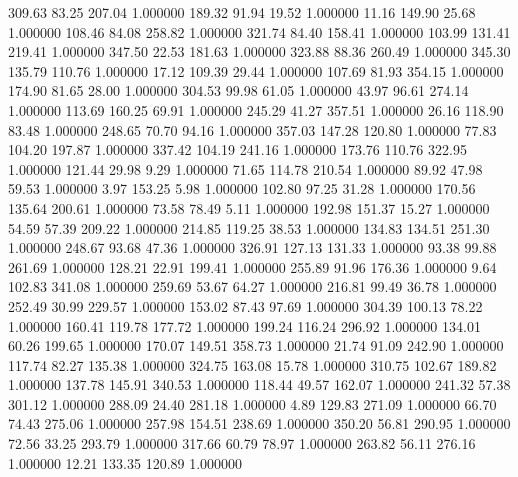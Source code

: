     309.63     83.25    207.04  1.000000
    189.32     91.94     19.52  1.000000
     11.16    149.90     25.68  1.000000
    108.46     84.08    258.82  1.000000
    321.74     84.40    158.41  1.000000
    103.99    131.41    219.41  1.000000
    347.50     22.53    181.63  1.000000
    323.88     88.36    260.49  1.000000
    345.30    135.79    110.76  1.000000
     17.12    109.39     29.44  1.000000
    107.69     81.93    354.15  1.000000
    174.90     81.65     28.00  1.000000
    304.53     99.98     61.05  1.000000
     43.97     96.61    274.14  1.000000
    113.69    160.25     69.91  1.000000
    245.29     41.27    357.51  1.000000
     26.16    118.90     83.48  1.000000
    248.65     70.70     94.16  1.000000
    357.03    147.28    120.80  1.000000
     77.83    104.20    197.87  1.000000
    337.42    104.19    241.16  1.000000
    173.76    110.76    322.95  1.000000
    121.44     29.98      9.29  1.000000
     71.65    114.78    210.54  1.000000
     89.92     47.98     59.53  1.000000
      3.97    153.25      5.98  1.000000
    102.80     97.25     31.28  1.000000
    170.56    135.64    200.61  1.000000
     73.58     78.49      5.11  1.000000
    192.98    151.37     15.27  1.000000
     54.59     57.39    209.22  1.000000
    214.85    119.25     38.53  1.000000
    134.83    134.51    251.30  1.000000
    248.67     93.68     47.36  1.000000
    326.91    127.13    131.33  1.000000
     93.38     99.88    261.69  1.000000
    128.21     22.91    199.41  1.000000
    255.89     91.96    176.36  1.000000
      9.64    102.83    341.08  1.000000
    259.69     53.67     64.27  1.000000
    216.81     99.49     36.78  1.000000
    252.49     30.99    229.57  1.000000
    153.02     87.43     97.69  1.000000
    304.39    100.13     78.22  1.000000
    160.41    119.78    177.72  1.000000
    199.24    116.24    296.92  1.000000
    134.01     60.26    199.65  1.000000
    170.07    149.51    358.73  1.000000
     21.74     91.09    242.90  1.000000
    117.74     82.27    135.38  1.000000
    324.75    163.08     15.78  1.000000
    310.75    102.67    189.82  1.000000
    137.78    145.91    340.53  1.000000
    118.44     49.57    162.07  1.000000
    241.32     57.38    301.12  1.000000
    288.09     24.40    281.18  1.000000
      4.89    129.83    271.09  1.000000
     66.70     74.43    275.06  1.000000
    257.98    154.51    238.69  1.000000
    350.20     56.81    290.95  1.000000
     72.56     33.25    293.79  1.000000
    317.66     60.79     78.97  1.000000
    263.82     56.11    276.16  1.000000
     12.21    133.35    120.89  1.000000
